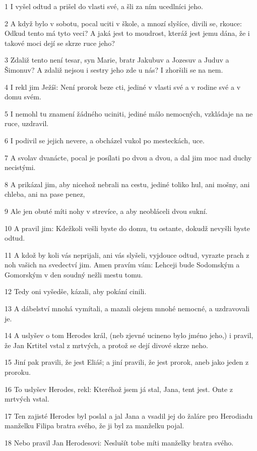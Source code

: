 \par 1 I vyšel odtud a prišel do vlasti své, a šli za ním ucedlníci jeho.
\par 2 A když bylo v sobotu, pocal uciti v škole, a mnozí slyšíce, divili se, rkouce: Odkud tento má tyto veci? A jaká jest to moudrost, kteráž jest jemu dána, že i takové moci dejí se skrze ruce jeho?
\par 3 Zdaliž tento není tesar, syn Marie, bratr Jakubuv a Jozesuv a Juduv a Šimonuv? A zdaliž nejsou i sestry jeho zde u nás? I zhoršili se na nem.
\par 4 I rekl jim Ježíš: Není prorok beze cti, jediné v vlasti své a v rodine své a v domu svém.
\par 5 I nemohl tu znamení žádného uciniti, jediné málo nemocných, vzkládaje na ne ruce, uzdravil.
\par 6 I podivil se jejich nevere, a obcházel vukol po mesteckách, uce.
\par 7 A svolav dvanácte, pocal je posílati po dvou a dvou, a dal jim moc nad duchy necistými.
\par 8 A prikázal jim, aby nicehož nebrali na cestu, jediné toliko hul, ani mošny, ani chleba, ani na pase penez,
\par 9 Ale jen obuté míti nohy v strevíce, a aby neobláceli dvou sukní.
\par 10 A pravil jim: Kdežkoli vešli byste do domu, tu ostante, dokudž nevyšli byste odtud.
\par 11 A kdož by koli vás neprijali, ani vás slyšeli, vyjdouce odtud, vyrazte prach z noh vašich na svedectví jim. Amen pravím vám: Lehceji bude Sodomským a Gomorským v den soudný nežli mestu tomu.
\par 12 Tedy oni vyšedše, kázali, aby pokání cinili.
\par 13 A dábelství mnohá vymítali, a mazali olejem mnohé nemocné, a uzdravovali je.
\par 14 A uslyšev o tom Herodes král, (neb zjevné ucineno bylo jméno jeho,) i pravil, že Jan Krtitel vstal z mrtvých, a protož se dejí divové skrze neho.
\par 15 Jiní pak pravili, že jest Eliáš; a jiní pravili, že jest prorok, aneb jako jeden z proroku.
\par 16 To uslyšev Herodes, rekl: Kteréhož jsem já stal, Jana, tent jest. Onte z mrtvých vstal.
\par 17 Ten zajisté Herodes byl poslal a jal Jana a vsadil jej do žaláre pro Herodiadu manželku Filipa bratra svého, že ji byl za manželku pojal.
\par 18 Nebo pravil Jan Herodesovi: Neslušít tobe míti manželky bratra svého.
